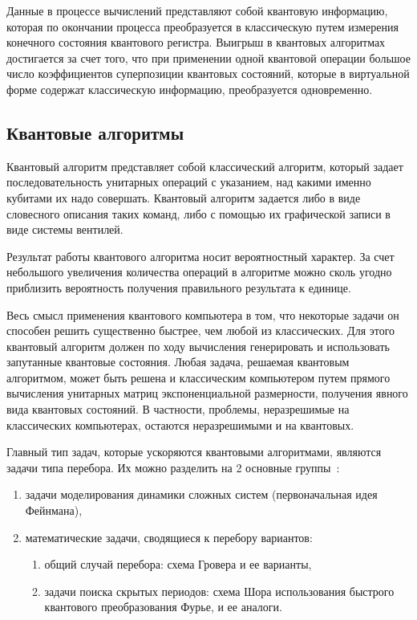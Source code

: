 \documentclass[pscyr,notitlepage]{hedwork}
\renewcommand{\~}[1]{\widetilde{#1}}
\begin{document}
  Данные в процессе вычислений представляют собой квантовую информацию, которая
  по окончании процесса преобразуется в классическую путем измерения конечного
  состояния квантового регистра. Выигрыш в квантовых алгоритмах достигается за
  счет того, что при применении одной квантовой операции большое число
  коэффициентов суперпозиции квантовых состояний, которые в виртуальной форме
  содержат классическую информацию, преобразуется
  одновременно.~\cite{task,brbr,1}
  
  \subsection{Квантовые алгоритмы}
  
  Квантовый алгоритм представляет собой классический алгоритм, который задает
  последовательность унитарных операций с указанием, над какими именно кубитами
  их надо совершать. Квантовый алгоритм задается либо в виде словесного
  описания таких команд, либо с помощью их графической записи в виде системы
  вентилей.

  Результат работы квантового алгоритма носит вероятностный характер. За счет
  небольшого увеличения количества операций в алгоритме можно сколь угодно
  приблизить вероятность получения правильного результата к единице.
  
  Весь смысл применения квантового компьютера в том, что некоторые задачи он
  способен решить существенно быстрее, чем любой из классических. Для этого
  квантовый алгоритм должен по ходу вычисления генерировать и использовать
  запутанные квантовые состояния. Любая задача, решаемая квантовым алгоритмом,
  может быть решена и классическим компьютером путем прямого вычисления
  унитарных матриц экспоненциальной размерности, получения явного вида
  квантовых состояний. В частности, проблемы, неразрешимые на классических
  компьютерах, остаются неразрешимыми и на квантовых.
  
  Главный тип задач, которые ускоряются квантовыми алгоритмами, являются задачи
  типа перебора. Их можно разделить на 2 основные группы~\cite{task,brbr,1}:
  \begin{enumerate}
    \itemsep -.8ex
    \item задачи моделирования динамики сложных систем (первоначальная идея
      Фейнмана),
    \item математические задачи, сводящиеся к перебору вариантов:
      \vspace{-2ex}
      \begin{enumerate}
        \itemsep -.8ex
        \item общий случай перебора: схема Гровера и ее варианты,
        \item задачи поиска скрытых периодов: схема Шора использования
          быстрого квантового преобразования Фурье, и ее аналоги.
      \end{enumerate}
  \end{enumerate}
\end{document}

